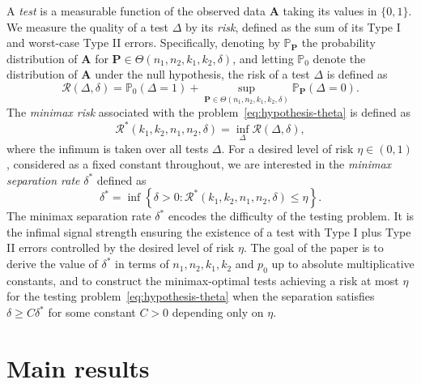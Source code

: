 \documentclass{article}
\newcommand{\A}{\mathbf{A}}
\newcommand{\bP}{\mathbf{P}}
\newcommand{\cR}{\mathcal{R}}
\begin{document}
A \textit{test} is a measurable function of the observed data $\A$ taking its values in $\{0,1\}$. 
We measure the quality of a test $\Delta$ by its \textit{risk}, defined as the sum of its Type I and worst-case Type II errors. 
Specifically, denoting by $\mathbb P_{\bP}$ the probability distribution of $\A$ for $\bP \in \Theta(n_1, n_2, k_1, k_2, \delta)$, and letting $\mathbb P_{0}$ denote the distribution of $\A$ under the null hypothesis, the risk of a test $\Delta$ is defined as
\begin{equation}\label{eq_def_risk}
    \cR(\Delta, \delta) = \mathbb P_{0}(\Delta = 1) + \sup_{\bP \in \Theta(n_1, n_2, k_1, k_2, \delta)} \mathbb P_{\bP}(\Delta = 0).
\end{equation}
The \textit{minimax risk} associated with the problem~\eqref{eq:hypothesis-theta} is defined as
\begin{equation}
    \cR^*(k_1,k_2,n_1,n_2, \delta) = \inf_{\Delta} \cR(\Delta, \delta),
\end{equation}
where the infimum is taken over all tests $\Delta$.
For a desired level of risk $\eta \in (0,1)$, considered as a fixed constant throughout, we are interested in the \textit{minimax separation rate} $\delta^*$ defined as 
\begin{equation}\label{eq_separation}
    \delta^* = \inf \left\{\delta>0: \cR^*(k_1,k_2,n_1,n_2,\delta) \leq \eta\right\}.
\end{equation}
The minimax separation rate $\delta^*$ encodes the difficulty of the testing problem. 
It is the infimal signal strength ensuring the existence of a test with Type I plus Type II errors controlled by the desired level of risk $\eta$. 
The goal of the paper is to derive the value of $\delta^*$ in terms of $n_1, n_2, k_1,k_2$ and $p_0$ up to absolute multiplicative constants, and to construct the minimax-optimal tests achieving a risk at most $\eta$ for the testing problem~\eqref{eq:hypothesis-theta} when the separation satisfies $\delta \geq C \delta^*$ for some constant $C>0$ depending only on $\eta$. 



\section{Main results}\label{sec:results}
\end{document}

